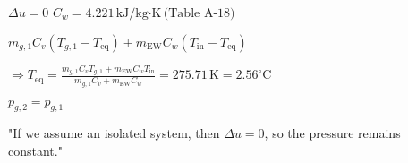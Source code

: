 \( \Delta u = 0 \)  
\( C_w = 4.221 \, \text{kJ/kg·K} \, \text{(Table A-18)} \)  

\( m_{g,1} C_v (T_{g,1} - T_{\text{eq}}) + m_{\text{EW}} C_w (T_{\text{in}} - T_{\text{eq}}) \)  

\( \Rightarrow T_{\text{eq}} = \frac{m_{g,1} C_v T_{g,1} + m_{\text{EW}} C_w T_{\text{in}}}{m_{g,1} C_v + m_{\text{EW}} C_w} = 275.71 \, \text{K} = 2.56^\circ \text{C} \)  

\( p_{g,2} = p_{g,1} \)  

"If we assume an isolated system, then \( \Delta u = 0 \), so the pressure remains constant."